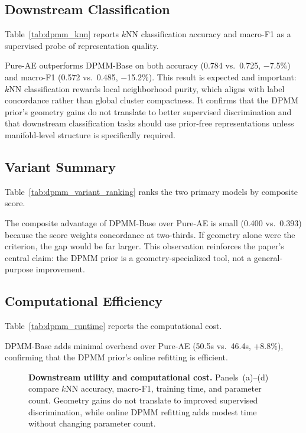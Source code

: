 \documentclass[biology,article,submit,pdftex,moreauthors]{Definitions/mdpi}
\begin{document}
\subsection{Downstream Classification}
Table~\ref{tab:dpmm_knn} reports $k$NN classification accuracy and macro-F1 as a supervised probe of representation quality.



Pure-AE outperforms DPMM-Base on both accuracy (0.784 vs.\ 0.725, $-$7.5\%) and macro-F1 (0.572 vs.\ 0.485, $-$15.2\%). This result is expected and important: $k$NN classification rewards local neighborhood purity, which aligns with label concordance rather than global cluster compactness. It confirms that the DPMM prior's geometry gains do not translate to better supervised discrimination and that downstream classification tasks should use prior-free representations unless manifold-level structure is specifically required.

\subsection{Variant Summary}
Table~\ref{tab:dpmm_variant_ranking} ranks the two primary models by composite score.



The composite advantage of DPMM-Base over Pure-AE is small (0.400 vs.\ 0.393) because the score weights concordance at two-thirds. If geometry alone were the criterion, the gap would be far larger. This observation reinforces the paper's central claim: the DPMM prior is a geometry-specialized tool, not a general-purpose improvement.

\subsection{Computational Efficiency}
Table~\ref{tab:dpmm_runtime} reports the computational cost.



DPMM-Base adds minimal overhead over Pure-AE (50.5s vs.\ 46.4s, +8.8\%), confirming that the DPMM prior's online refitting is efficient.

\begin{figure}[H]
\centering

\caption{\textbf{Downstream utility and computational cost.} Panels~(a)--(d) compare $k$NN accuracy, macro-F1, training time, and parameter count. Geometry gains do not translate to improved supervised discrimination, while online DPMM refitting adds modest time without changing parameter count.}
\label{fig:utility-cost}
\end{figure}
\end{document}
